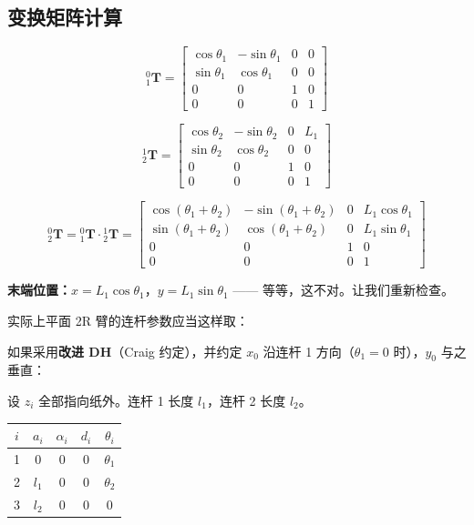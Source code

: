 \subsection{变换矩阵计算}

\[
{}^{0}_{1}\mathbf{T} = \begin{bmatrix}
	\cos\theta_1 & -\sin\theta_1 & 0 & 0 \\
	\sin\theta_1 &  \cos\theta_1 & 0 & 0 \\
	0            &  0            & 1 & 0 \\
	0            &  0            & 0 & 1
\end{bmatrix}
\]

\[
{}^{1}_{2}\mathbf{T} = \begin{bmatrix}
	\cos\theta_2 & -\sin\theta_2 & 0 & L_1 \\
	\sin\theta_2 &  \cos\theta_2 & 0 & 0 \\
	0            &  0            & 1 & 0 \\
	0            &  0            & 0 & 1
\end{bmatrix}
\]

\[
{}^{0}_{2}\mathbf{T} = {}^{0}_{1}\mathbf{T} \cdot {}^{1}_{2}\mathbf{T} = \begin{bmatrix}
	\cos(\theta_1+\theta_2) & -\sin(\theta_1+\theta_2) & 0 & L_1\cos\theta_1 \\
	\sin(\theta_1+\theta_2) &  \cos(\theta_1+\theta_2) & 0 & L_1\sin\theta_1 \\
	0                        &  0                        & 1 & 0 \\
	0                        &  0                        & 0 & 1
\end{bmatrix}
\]

\textbf{末端位置：}$x = L_1\cos\theta_1$，$y = L_1\sin\theta_1$ —— 等等，这不对。让我们重新检查。

实际上平面 2R 臂的连杆参数应当这样取：

如果采用\textbf{改进 DH}（Craig 约定），并约定 $x_0$ 沿连杆 1 方向（$\theta_1=0$ 时），$y_0$ 与之垂直：

设 $z_i$ 全部指向纸外。连杆 1 长度 $l_1$，连杆 2 长度 $l_2$。

\begin{center}
	\begin{tabular}{ccccc}
		\toprule
		$i$ & $a_i$ & $\alpha_i$ & $d_i$ & $\theta_i$ \\
		\midrule
		1 & 0    & 0 & 0      & $\theta_1$ \\
		2 & $l_1$ & 0 & 0      & $\theta_2$ \\
		3 & $l_2$ & 0 & 0      & 0 \\
		\bottomrule
	\end{tabular}
\end{center}

